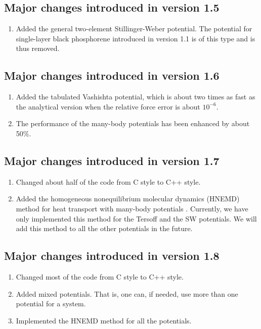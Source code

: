 \documentclass[12pt,a4paper]{report}
\begin{document}
\subsection{Major changes introduced in version 1.5}
\begin{enumerate}
\item Added the general two-element Stillinger-Weber potential. The potential for single-layer black phosphorene introduced in version 1.1 is of this type and is thus removed.
\end{enumerate}

\subsection{Major changes introduced in version 1.6}
\begin{enumerate}
\item Added the tabulated Vashishta potential, which is about two times as fast as the analytical version when the relative force error is about $10^{-6}$.
\item The performance of the many-body potentials has been enhanced by about 50\%.
\end{enumerate}


\subsection{Major changes introduced in version 1.7}
\begin{enumerate}
\item Changed about half of the code from C style to C++ style.
\item Added the homogeneous nonequilibrium molecular dynamics (HNEMD) method for heat transport with many-body potentials \cite{fan2018submitted,xu2018msmse,dong2018pccp}. Currently, we have only implemented this method for the Tersoff and the SW potentials. We will add this method to all the other potentials in the future. 
\end{enumerate}

\subsection{Major changes introduced in version 1.8}
\begin{enumerate}
\item Changed most of the code from C style to C++ style.
\item Added mixed potentials. That is, one can, if needed, use more than one potential for a system.
\item Implemented the HNEMD method \cite{fan2018submitted,xu2018msmse,xu2018submitted,dong2018pccp} for all the potentials.
\end{enumerate}
\end{document}
